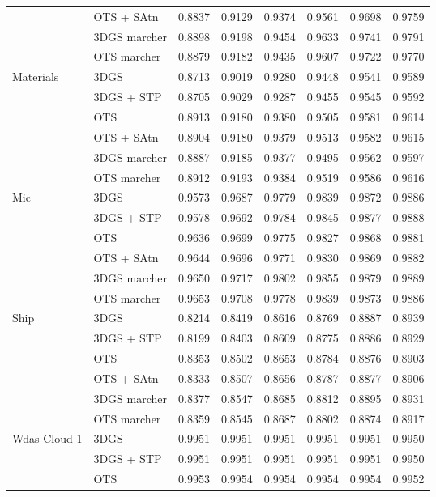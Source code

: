 \begin{longtable}[H]{llrrrrrr}
 & OTS + SAtn & 0.8837 & 0.9129 & 0.9374 & 0.9561 & 0.9698 & 0.9759 \\
 & 3DGS marcher & 0.8898 & 0.9198 & 0.9454 & 0.9633 & 0.9741 & 0.9791 \\
 & OTS marcher & 0.8879 & 0.9182 & 0.9435 & 0.9607 & 0.9722 & 0.9770 \\
Materials & 3DGS & 0.8713 & 0.9019 & 0.9280 & 0.9448 & 0.9541 & 0.9589 \\
 & 3DGS + STP & 0.8705 & 0.9029 & 0.9287 & 0.9455 & 0.9545 & 0.9592 \\
 & OTS & 0.8913 & 0.9180 & 0.9380 & 0.9505 & 0.9581 & 0.9614 \\
 & OTS + SAtn & 0.8904 & 0.9180 & 0.9379 & 0.9513 & 0.9582 & 0.9615 \\
 & 3DGS marcher & 0.8887 & 0.9185 & 0.9377 & 0.9495 & 0.9562 & 0.9597 \\
 & OTS marcher & 0.8912 & 0.9193 & 0.9384 & 0.9519 & 0.9586 & 0.9616 \\
Mic & 3DGS & 0.9573 & 0.9687 & 0.9779 & 0.9839 & 0.9872 & 0.9886 \\
 & 3DGS + STP & 0.9578 & 0.9692 & 0.9784 & 0.9845 & 0.9877 & 0.9888 \\
 & OTS & 0.9636 & 0.9699 & 0.9775 & 0.9827 & 0.9868 & 0.9881 \\
 & OTS + SAtn & 0.9644 & 0.9696 & 0.9771 & 0.9830 & 0.9869 & 0.9882 \\
 & 3DGS marcher & 0.9650 & 0.9717 & 0.9802 & 0.9855 & 0.9879 & 0.9889 \\
 & OTS marcher & 0.9653 & 0.9708 & 0.9778 & 0.9839 & 0.9873 & 0.9886 \\
Ship & 3DGS & 0.8214 & 0.8419 & 0.8616 & 0.8769 & 0.8887 & 0.8939 \\
 & 3DGS + STP & 0.8199 & 0.8403 & 0.8609 & 0.8775 & 0.8886 & 0.8929 \\
 & OTS & 0.8353 & 0.8502 & 0.8653 & 0.8784 & 0.8876 & 0.8903 \\
 & OTS + SAtn & 0.8333 & 0.8507 & 0.8656 & 0.8787 & 0.8877 & 0.8906 \\
 & 3DGS marcher & 0.8377 & 0.8547 & 0.8685 & 0.8812 & 0.8895 & 0.8931 \\
 & OTS marcher & 0.8359 & 0.8545 & 0.8687 & 0.8802 & 0.8874 & 0.8917 \\
Wdas Cloud 1 & 3DGS & 0.9951 & 0.9951 & 0.9951 & 0.9951 & 0.9951 & 0.9950 \\
 & 3DGS + STP & 0.9951 & 0.9951 & 0.9951 & 0.9951 & 0.9951 & 0.9950 \\
 & OTS & 0.9953 & 0.9954 & 0.9954 & 0.9954 & 0.9954 & 0.9952 \\

\end{longtable}
